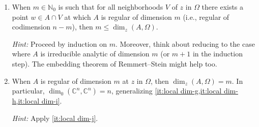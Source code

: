 \documentclass[a4paper]{amsart}
\newcommand{\N}{\mathbb{N}}
\newcommand{\C}{\mathbb{C}}
\theoremstyle{remark}
\numberwithin{equation}{question}
\DeclarePairedDelimiter\set{\{}{\}}
\begin{document}
\begin{question}[subtitle=On the local dimension of an analytic set]
\begin{enumerate}
\item \label{it:local dim-j} When $m \in \N_0$ is such that for all neighborhoods $V$ of $z$ in $\Omega$ there exists a point $w \in A \cap V$ at which $A$ is regular of dimension $m$ (i.e., regular of codimension $n-m$), then $m \le \dim_z(A,\Omega)$.

\emph{Hint:} Proceed by induction on $m$. Moreover, think about reducing to the case where $A$ is irreducible analytic of dimension $m$ (or $m+1$ in the induction step). The embedding theorem of Remmert--Stein might help too.
\item When $A$ is regular of dimension $m$ at $z$ in $\Omega$, then $\dim_z(A,\Omega) = m$. In particular, $\dim_0(\C^n,\C^n) = n$, generalizing \cref{it:local dim-g,it:local dim-h,it:local dim-i}.

\emph{Hint:} Apply \cref{it:local dim-j}.
\end{enumerate}
\end{question}
\end{document}

